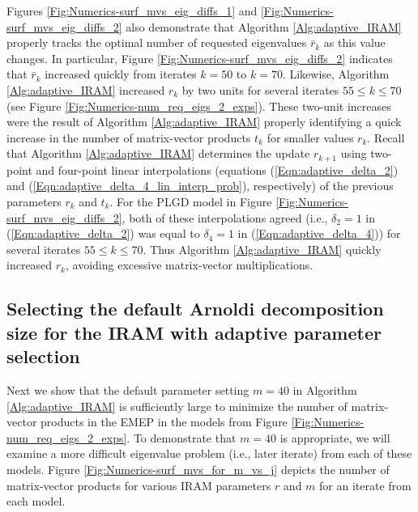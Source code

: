 Figures \ref{Fig:Numerics-surf_mvs_eig_diffs_1} and \ref{Fig:Numerics-surf_mvs_eig_diffs_2} also demonstrate that Algorithm \ref{Alg:adaptive_IRAM} properly tracks the optimal number of requested eigenvalues $\bar{r}_k$ as this value changes.
In particular, Figure \ref{Fig:Numerics-surf_mvs_eig_diffs_2} indicates that $\bar{r}_k$ increased quickly from iterates $k = 50$ to $k = 70$.
Likewise, Algorithm \ref{Alg:adaptive_IRAM} increased $r_k$ by two units for several iterates $55 \leq k \leq 70$ (see Figure \ref{Fig:Numerics-num_req_eigs_2_exps}).
These two-unit increases were the result of Algorithm \ref{Alg:adaptive_IRAM} properly identifying a quick increase in the number of matrix-vector products $t_k$ for smaller values $r_k$.
Recall that Algorithm \ref{Alg:adaptive_IRAM} determines the update $r_{k+1}$ using two-point and four-point linear interpolations (equations (\ref{Eqn:adaptive_delta_2}) and (\ref{Eqn:adaptive_delta_4_lin_interp_prob}), respectively) of the previous parameters $r_k$ and $t_k$.
For the PLGD model in Figure \ref{Fig:Numerics-surf_mvs_eig_diffs_2}, both of these interpolations agreed (i.e., $\delta_2=1$ in (\ref{Eqn:adaptive_delta_2}) was equal to $\delta_4=1$ in (\ref{Eqn:adaptive_delta_4})) for several iterates $55 \leq k \leq 70$.
Thus Algorithm \ref{Alg:adaptive_IRAM} quickly increased $r_k$, avoiding excessive matrix-vector multiplications.







\subsection{Selecting the default Arnoldi decomposition size for the IRAM with adaptive parameter selection}		\label{Subsubsec:Numerics-default_Arnoldi_decomp_size}



Next we show that the default parameter setting $m = 40$ in Algorithm \ref{Alg:adaptive_IRAM} is sufficiently large to minimize the number of matrix-vector products in the EMEP in the models from Figure \ref{Fig:Numerics-num_req_eigs_2_exps}.
To demonstrate that $m=40$ is appropriate, we will examine a more difficult eigenvalue problem (i.e., later iterate) from each of these models.
Figure \ref{Fig:Numerics-surf_mvs_for_m_vs_j} depicts the number of matrix-vector products for various IRAM parameters $r$ and $m$ for an iterate from each model.


